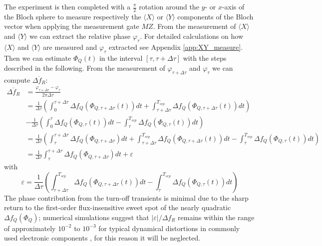 The experiment is then completed with a $\frac{\pi}{2}$ rotation around the $y$- or $x$-axis of the Bloch sphere to measure respectively the $\langle X \rangle$ or $\langle Y \rangle$ components of the Bloch vector when applying the measurement gate $MZ$. 
From the measurement of $\langle X \rangle$ and $\langle Y \rangle$ we can extract the relative phase $\varphi_{\tau}$.
For detailed calculations on how $\langle X \rangle$ and $\langle Y \rangle$ are measured and $\varphi_{\tau}$ extracted see Appendix \ref{app:XY_measure}. \\ 

Then we can estimate $\Phi_Q(t)$ in the interval $[\tau,\tau+\Delta\tau]$ with the steps described in the following.
From the measurement of $\varphi_{\tau + \Delta\tau}$ and $\varphi_\tau$ we can compute $\overline{\Delta f_R}$:
\begin{align}\label{eq:detuning}
    \overline{\Delta f_R} &= \frac{\varphi_{\tau+\Delta\tau} - \varphi_\tau}{2\pi\Delta\tau}\\ 
    &= \frac{1}{\Delta\tau}\left(\int_{0}^{\tau+\Delta\tau}\Delta f_Q (\Phi_{Q,\tau+\Delta\tau}(t))dt + \int_{\tau+\Delta\tau}^{T_{sep}}\Delta f_Q (\Phi_{Q,\tau+\Delta\tau}(t))dt\right) \\
    &-\frac{1}{\Delta\tau}\left(\int_{0}^{\tau}\Delta f_Q (\Phi_{Q,\tau}(t))dt - \int_{\tau}^{T_{sep}}\Delta f_Q (\Phi_{Q,\tau}(t))dt\right)\\
    &=\frac{1}{\Delta\tau}\left(\int_{\tau}^{\tau+\Delta\tau} \Delta f_Q(\Phi_{Q,\tau+\Delta\tau})dt + \int_{\tau+\Delta\tau}^{T_{sep}}\Delta f_Q (\Phi_{Q,\tau+\Delta\tau}(t))dt - \int_{\tau}^{T_{sep}}\Delta f_Q (\Phi_{Q,\tau}(t))dt\right)\\
    &= \frac{1}{\Delta\tau}\int_{\tau}^{\tau+\Delta\tau} \Delta f_Q(\Phi_{Q,\tau+\Delta\tau})dt + \varepsilon
\end{align}  
with \[\varepsilon = \frac{1}{\Delta\tau}\left(\int_{\tau+\Delta\tau}^{T_{sep}}\Delta f_Q (\Phi_{Q,\tau+\Delta\tau}(t))dt - \int_{\tau}^{T_{sep}}\Delta f_Q (\Phi_{Q,\tau}(t))dt\right)\]
The phase contribution from the turn-off transients is minimal due to the sharp return to the first-order flux-insensitive sweet spot of the nearly quadratic $\Delta f_Q(\Phi_Q)$; 
numerical simulations suggest that $|\varepsilon|/\Delta f_R$ remains within the range of approximately $10^{-2}$ to $10^{-3}$ for typical dynamical distortions in commonly used electronic components \cite{negligible} \cite{Langford2017}, for this reason it will be neglected.\\

